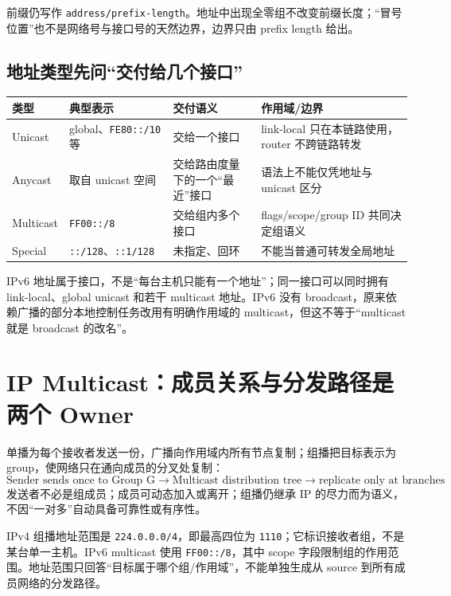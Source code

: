 \documentclass[11pt,a4paper]{ctexart}
\newcommand{\code}[1]{\texttt{#1}}
\begin{document}
前缀仍写作 \code{address/prefix-length}。地址中出现全零组不改变前缀长度；“冒号位置”也不是网络号与接口号的天然边界，边界只由 prefix length 给出。

\subsection{地址类型先问“交付给几个接口”}

\begin{center}\small
\begin{tabularx}{\linewidth}{L{2.1cm}L{2.7cm}Y Y}
\toprule
类型 & 典型表示 & 交付语义 & 作用域/边界\\
\midrule
Unicast & global、\code{FE80::/10} 等 & 交给一个接口 & link-local 只在本链路使用，router 不跨链路转发\\
Anycast & 取自 unicast 空间 & 交给路由度量下的一个“最近”接口 & 语法上不能仅凭地址与 unicast 区分\\
Multicast & \code{FF00::/8} & 交给组内多个接口 & flags/scope/group ID 共同决定组语义\\
Special & \code{::/128}、\code{::1/128} & 未指定、回环 & 不能当普通可转发全局地址\\
\bottomrule
\end{tabularx}
\end{center}

IPv6 地址属于接口，不是“每台主机只能有一个地址”；同一接口可以同时拥有 link-local、global unicast 和若干 multicast 地址。IPv6 没有 broadcast，原来依赖广播的部分本地控制任务改用有明确作用域的 multicast，但这不等于“multicast 就是 broadcast 的改名”。

\section{IP Multicast：成员关系与分发路径是两个 Owner}

单播为每个接收者发送一份，广播向作用域内所有节点复制；组播把目标表示为 group，使网络只在通向成员的分叉处复制：
\[
\boxed{
\text{Sender sends once to Group G}
\to\text{Multicast distribution tree}
\to\text{replicate only at branches}
}.
\]
发送者不必是组成员；成员可动态加入或离开；组播仍继承 IP 的尽力而为语义，不因“一对多”自动具备可靠性或有序性。

IPv4 组播地址范围是 \code{224.0.0.0/4}，即最高四位为 \code{1110}；它标识接收者组，不是某台单一主机。IPv6 multicast 使用 \code{FF00::/8}，其中 scope 字段限制组的作用范围。地址范围只回答“目标属于哪个组/作用域”，不能单独生成从 source 到所有成员网络的分发路径。
\end{document}
